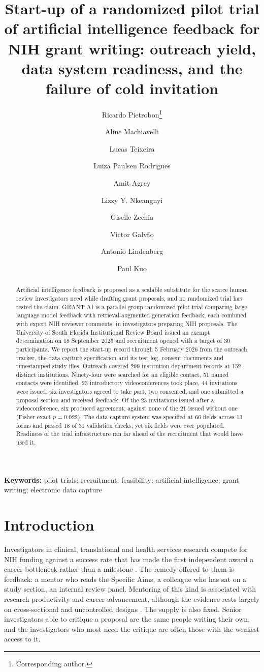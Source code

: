 \documentclass[11pt,a4paper]{article}
\title{Start-up of a randomized pilot trial of artificial intelligence feedback for NIH grant writing: outreach yield, data system readiness, and the failure of cold invitation}
\author[1,2]{Ricardo Pietrobon\thanks{Corresponding author.}}
\author[1,2]{Aline Machiavelli}
\author[1,2]{Lucas Teixeira}
\author[1]{Luiza Paulsen Rodrigues}
\author[1]{Amit Agrey}
\author[1]{Lizzy Y. Nkeangnyi}
\author[1]{Giselle Zechia}
\author[1]{Victor Galv\~{a}o}
\author[1]{Antonio Lindenberg}
\author[3]{Paul Kuo}
\affil[1]{SporeData Inc, Durham, NC, USA}
\affil[2]{SporeData O\"{U}, Tallinn, Estonia}
\affil[3]{Department of Surgery, University of South Florida, Tampa, FL, USA}
\date{}
\begin{document}
\maketitle
\begin{abstract}
Artificial intelligence feedback is proposed as a scalable substitute for the scarce human review investigators need while drafting grant proposals, and no randomized trial has tested the claim. GRANT-AI is a parallel-group randomized pilot trial comparing large language model feedback with retrieval-augmented generation feedback, each combined with expert NIH reviewer comments, in investigators preparing NIH proposals. The University of South Florida Institutional Review Board issued an exempt determination on 18 September 2025 and recruitment opened with a target of 30 participants. We report the start-up record through 5 February 2026 from the outreach tracker, the data capture specification and its test log, consent documents and timestamped study files. Outreach covered 299 institution-department records at 152 distinct institutions. Ninety-four were searched for an eligible contact, 51 named contacts were identified, 23 introductory videoconferences took place, 44 invitations were issued, six investigators agreed to take part, two consented, and one submitted a proposal section and received feedback. Of the 23 invitations issued after a videoconference, six produced agreement, against none of the 21 issued without one (Fisher exact $p = 0.022$). The data capture system was specified at 66 fields across 13 forms and passed 18 of 31 validation checks, yet six fields were ever populated. Readiness of the trial infrastructure ran far ahead of the recruitment that would have used it.
\end{abstract}
\noindent\textbf{Keywords:} pilot trials; recruitment; feasibility; artificial intelligence; grant writing; electronic data capture


\section{Introduction}

Investigators in clinical, translational and health services research compete for NIH funding against a success rate that has made the first independent award a career bottleneck rather than a milestone \cite{r1}. The remedy offered to them is feedback: a mentor who reads the Specific Aims, a colleague who has sat on a study section, an internal review panel. Mentoring of this kind is associated with research productivity and career advancement, although the evidence rests largely on cross-sectional and uncontrolled designs \cite{r2}. The supply is also fixed. Senior investigators able to critique a proposal are the same people writing their own, and the investigators who most need the critique are often those with the weakest access to it.
\end{document}
